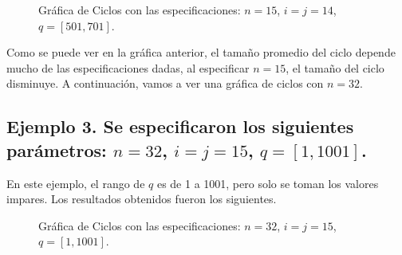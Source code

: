 \documentclass[12pt,3p]{elsarticle}
\begin{document}
\begin{figure}[H]
\centering
{}
\caption{Gráfica de Ciclos con las especificaciones:  $ n=15$, $ i=j=14$, $ q=[501,701]$.} \label{Param2}
\end{figure}

Como se puede ver en la gráfica anterior, el tamaño promedio del ciclo depende mucho de las especificaciones dadas, al especificar $n=15$, el tamaño del ciclo disminuye. A continuación, vamos a ver una gráfica de ciclos con $n=32$.

\subsection{Ejemplo 3. Se especificaron los siguientes parámetros: $ n=32$, $ i=j=15$, $ q=[1,1001]$.}
En este ejemplo, el rango de $q$ es de 1 a 1001, pero solo se toman los valores impares. Los resultados obtenidos fueron los siguientes.

\begin{figure}[H]
\centering
{}
\caption{Gráfica de Ciclos con las especificaciones:  $ n=32$, $ i=j=15$, $ q=[1,1001]$.} \label{Param3}
\end{figure}
\end{document}
